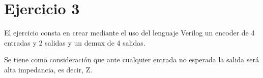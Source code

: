 \newpage
\section{Ejercicio 3}
\noindent
El ejercicio consta en crear mediante el uso del lenguaje Verilog un encoder de 4 entradas y 2 salidas y un demux de 4 salidas.\par
Se tiene como consideración que ante cualquier entrada no esperada la salida será alta impedancia, es decir, Z.